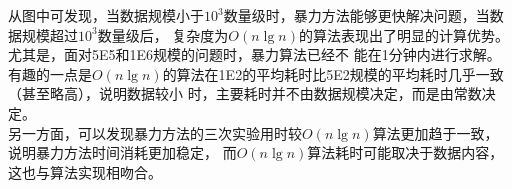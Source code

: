 \documentclass[a4paper]{article}
\begin{document}
\begin{enumerate}
\begin{center}
  \end{center}
  从图中可发现，当数据规模小于$10^3$数量级时，暴力方法能够更快解决问题，当数据规模超过$10^3$数量级后，
  复杂度为$O(n \lg n)$的算法表现出了明显的计算优势。尤其是，面对5E5和1E6规模的问题时，暴力算法已经不
  能在1分钟内进行求解。\\
  有趣的一点是$O(n \lg n)$的算法在1E2的平均耗时比5E2规模的平均耗时几乎一致（甚至略高），说明数据较小
  时，主要耗时并不由数据规模决定，而是由常数决定。\\
  另一方面，可以发现暴力方法的三次实验用时较$O(n \lg n)$算法更加趋于一致，说明暴力方法时间消耗更加稳定，
  而$O(n \lg n)$算法耗时可能取决于数据内容，这也与算法实现相吻合。
\end{enumerate}
\end{document}
